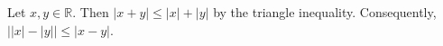 Let $x, y \in \mathbb{R}$.
Then $\lvert x + y \rvert \leq \lvert x \rvert + \lvert y \rvert$ by the triangle inequality.
Consequently, $\lvert \lvert x \rvert - \lvert y \rvert \rvert \leq \lvert x - y \rvert$.